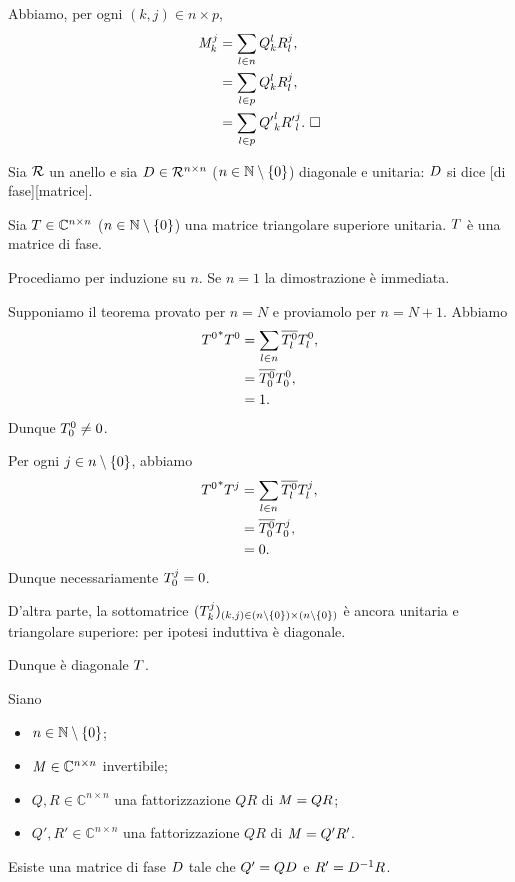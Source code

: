 \Proof Abbiamo, per ogni
$(k,j) \in n \times p$,
\begin{align*}
  \mathit{M}_k^j
  &= \sum_{l \in n} Q_k^l R_l^j,\\
  &= \sum_{l \in p} Q_k^l R_l^j,\\
  &= \sum_{l \in p} {Q'}_k^l {R'}_l^j.\text{ $\square$}
\end{align*}
\begin{Definition}
  Sia $\mathcal{R}$ un anello e sia
  $D \in \mathcal{R}^{n \times n}$ ($n \in \mathbb{N} \setminus \lbrace 0 \rbrace$)
  diagonale e unitaria: $D$ si dice
  [di fase][matrice].
\end{Definition}
\begin{Theorem}
  Sia $T \in \mathbb{C}^{n \times n}$ ($n \in \mathbb{N} \setminus \lbrace 0 \rbrace$) una 
  matrice triangolare superiore unitaria. $T$ \`e una matrice di fase.
\end{Theorem}
\Proof Procediamo per induzione su $n$. Se $n = 1$ la dimostrazione \`e
immediata.
\par Supponiamo il teorema provato per $n = N$ e proviamolo per $n = N + 1$.
Abbiamo
\begin{align*}
  {T^0}^* T^0
  &= \sum_{l \in n} \overline{T_l^0} T_l^0,\\
  &= \overline{T_0^0} T_0^0,\\
  &= 1.
\end{align*}
Dunque $T_0^0 \neq 0$.
\par Per ogni $j \in n \setminus \lbrace 0 \rbrace$, abbiamo
\begin{align*}
  {T^0}^* T^j
  &= \sum_{l \in n} \overline{T_l^0} T_l^j,\\
  &= \overline{T_0^0} T_0^j,\\
  &= 0.
\end{align*}
Dunque necessariamente $T_0^j = 0$.
\par D'altra parte, la sottomatrice
$(T_k^j)_{(k,j) \in (n \setminus \lbrace 0 \rbrace) \times (n \setminus \lbrace 0 \rbrace)}$
\`e ancora unitaria e triangolare superiore: per ipotesi induttiva \`e diagonale.
\par Dunque \`e diagonale $T$. \EndProof
\begin{Theorem}
  Siano
  \begin{itemize}
    \item $n \in \mathbb{N} \setminus \lbrace 0 \rbrace$;
    \item $\mathit{M} \in \mathbb{C}^{n \times n}$ invertibile;
    \item $Q, R \in \mathbb{C}^{n \times n}$ una fattorizzazione $QR$ di $\mathit{M} = QR$;
    \item $Q', R' \in \mathbb{C}^{n \times n}$ una fattorizzazione $QR$ di $\mathit{M} = Q'R'$.
  \end{itemize}
  Esiste una matrice di fase $D$ tale che
  $Q' = QD$ e
  $R' = D^{-1} R$.
\end{Theorem}
